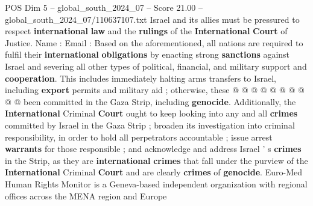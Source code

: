 \begin{textsample}{POS Dim 5 – global\_south\_2024\_07 – Score 21.00 – global\_south\_2024\_07/110637107.txt}
Israel and its allies must be pressured to respect \textbf{international} \textbf{law} and the \textbf{rulings} of the \textbf{International} \textbf{Court} of Justice.
Name : Email : Based on the aforementioned, all nations are required to fulfil their \textbf{international} \textbf{obligations} by enacting strong \textbf{sanctions} against Israel and severing all other types of political, financial, and military support and \textbf{cooperation}.
This includes immediately halting arms transfers to Israel, including \textbf{export} permits and military aid ; otherwise, these @ @ @ @ @ @ @ @ @ @ been committed in the Gaza Strip, including \textbf{genocide}.
Additionally, the \textbf{International} Criminal \textbf{Court} ought to keep looking into any and all \textbf{crimes} committed by Israel in the Gaza Strip ; broaden its investigation into criminal responsibility, in order to hold all perpetrators accountable ; issue arrest \textbf{warrants} for those responsible ; and acknowledge and address Israel ' s \textbf{crimes} in the Strip, as they are \textbf{international} \textbf{crimes} that fall under the purview of the \textbf{International} Criminal \textbf{Court} and are clearly \textbf{crimes} of \textbf{genocide}.
Euro-Med Human Rights Monitor is a Geneva-based independent organization with regional offices across the MENA region and Europe

\end{textsample}
